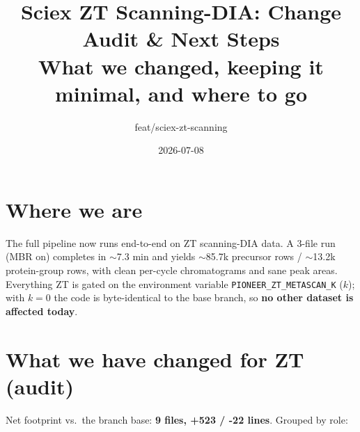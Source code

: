 \documentclass[11pt]{article}
\title{\textbf{Sciex ZT Scanning-DIA: Change Audit \& Next Steps}\\[4pt]
\large What we changed, keeping it minimal, and where to go}
\author{feat/sciex-zt-scanning}
\date{2026-07-08}
\begin{document}
\maketitle

\section{Where we are}

The full pipeline now runs end-to-end on ZT scanning-DIA data. A 3-file run
(MBR on) completes in $\sim$7.3 min and yields $\sim$85.7k precursor rows /
$\sim$13.2k protein-group rows, with clean per-cycle chromatograms and sane peak
areas. Everything ZT is gated on the environment variable
\texttt{PIONEER\_ZT\_METASCAN\_K} ($k$); with $k=0$ the code is byte-identical to
the base branch, so \textbf{no other dataset is affected today}.

\section{What we have changed for ZT (audit)}

Net footprint vs.\ the branch base: \textbf{9 files, +523 / -22 lines}. Grouped by
role:
\end{document}
